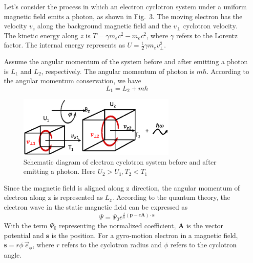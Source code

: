 \documentclass{cpbtex}
\begin{document}
\begin{CJK*}{GBK}{song}
Let's consider the process in which an electron cyclotron system under a uniform magnetic field emits a photon, as shown in Fig.~3. The moving electron has the velocity $v_z$ along the background magnetic field and the $v_\perp$ cyclotron velocity. The kinetic energy along $z$ is $T = \gamma m_e c^2 - m_e c^2$, where $\gamma$ refers to the Lorentz factor. The internal energy represents as $U = \frac{1}{2} \gamma m_e v_\perp^2$. 

Assume the angular momentum of the system before and after emitting a photon is $L_1$ and $L_2$, respectively. The angular momentum of photon is $m\hbar$. According to the angular momentum conservation, we have
\begin{equation}
L_1 = L_2 + m\hbar \label{eq:AngularCon} 
\end{equation}

\begin{figure}
\centering
\includegraphics[width=0.7\textwidth]{Figure3.eps}%
\caption{\label{fig:Schematic}Schematic diagram of electron cyclotron system before and after emitting a photon. Here \(U_2>U_1, T_2<T_1\)}
\end{figure}


Since the magnetic field is aligned along z direction, the angular momentum of electron along z is represented as $L_z$. According to the quantum theory, the electron wave in the static magnetic field can be expressed as
\begin{equation}
\Psi = \Psi_0 e^{\frac{i}{\hbar} (\mathbf{p} - e\mathbf{A}) \cdot \mathbf{s}} \label{eq:psi}
\end{equation}
With the term $\Psi_0$ representing the normalized coefficient, $\mathbf{A}$ is the vector potential and $\mathbf{s}$ is the position. For a gyro-motion electron in a magnetic field, $\mathbf{s} = r\phi\,\vec{e}_\phi$, where $r$ refers to the cyclotron radius and $\phi$ refers to the cyclotron angle. 


\end{CJK*}
\end{document}
